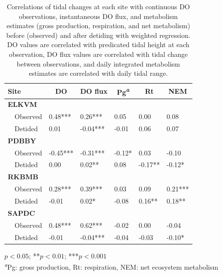 \documentclass[letterpaper,12pt,oneside]{article}\usepackage[]{graphicx}\usepackage[]{color}
\begin{document}
%
\begin{table}[!tbp]
\caption{Correlations of tidal changes at each site with continuous \ac{DO} observations, instantaneous \ac{DO} flux, and metabolism estimates (gross production, respiration, and net metabolism) before (observed) and after detiding with weighted regression.  \ac{DO} values are correlated with predicated tidal height at each observation, \ac{DO} flux values are correlated with tidal change between observations, and daily integrated metabolism estimates are correlated with daily tidal range.\label{tab:cor_res}} 
\begin{center}
\begin{tabular}{llllll}
\hline\hline
\multicolumn{1}{l}{Site}&\multicolumn{1}{c}{DO}&\multicolumn{1}{c}{DO flux}&\multicolumn{1}{c}{Pg\textsuperscript{\textit{a}}}&\multicolumn{1}{c}{Rt}&\multicolumn{1}{c}{NEM}\tabularnewline
\hline
{\bfseries ELKVM}&&&&&\tabularnewline
~~Observed& 0.48***& 0.26***& 0.05 & 0.00 & 0.08 \tabularnewline
~~Detided& 0.01 &-0.04***&-0.01 & 0.06 & 0.07 \tabularnewline
\hline
{\bfseries PDBBY}&&&&&\tabularnewline
~~Observed&-0.45***&-0.31***&-0.12*& 0.03 &-0.10 \tabularnewline
~~Detided& 0.00 & 0.02**& 0.08 &-0.17**&-0.12*\tabularnewline
\hline
{\bfseries RKBMB}&&&&&\tabularnewline
~~Observed& 0.28***& 0.39***& 0.03 & 0.09 & 0.21***\tabularnewline
~~Detided&-0.01 & 0.02*&-0.08 & 0.16**& 0.18**\tabularnewline
\hline
{\bfseries SAPDC}&&&&&\tabularnewline
~~Observed& 0.48***& 0.62***&-0.02 & 0.00 &-0.04 \tabularnewline
~~Detided&-0.01 &-0.04***&-0.04 &-0.03 &-0.10*\tabularnewline
\hline
\end{tabular}
\end{center}
\footnotesize *$p<0.05$; **$p<0.01$; ***$p<0.001$\\\textsuperscript{\textit{a}}Pg: gross production, Rt: respiration, NEM: net ecosystem metabolism\end{table}
\end{document}
